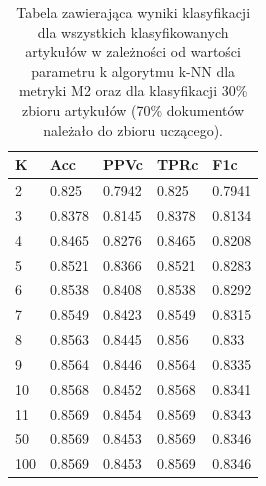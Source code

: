 \documentclass{classrep}
\begin{document}
\begin{table}[H]
    \centering
\caption{Tabela zawierająca wyniki klasyfikacji dla wszystkich klasyfikowanych artykułów w zależności od wartości parametru k algorytmu k-NN dla metryki M2 oraz dla klasyfikacji 30\% zbioru artykułów (70\% dokumentów należało do zbioru uczącego).}
\begin{adjustbox}{max width=\textwidth}
    \begin{tabular}{|l|l|l|l|l|}
    \hline
        K & Acc & PPVc & TPRc & F1c \\ \hline
        2 & 0.825 & 0.7942 & 0.825 & 0.7941 \\ \hline
        3 & 0.8378 & 0.8145 & 0.8378 & 0.8134 \\ \hline
        4 & 0.8465 & 0.8276 & 0.8465 & 0.8208 \\ \hline
        5 & 0.8521 & 0.8366 & 0.8521 & 0.8283 \\ \hline
        6 & 0.8538 & 0.8408 & 0.8538 & 0.8292 \\ \hline
        7 & 0.8549 & 0.8423 & 0.8549 & 0.8315 \\ \hline
        8 & 0.8563 & 0.8445 & 0.856 & 0.833 \\ \hline
        9 & 0.8564 & 0.8446 & 0.8564 & 0.8335 \\ \hline
        10 & 0.8568 & 0.8452 & 0.8568 & 0.8341 \\ \hline
        11 & 0.8569 & 0.8454 & 0.8569 & 0.8343 \\ \hline
        50 & 0.8569 & 0.8453 & 0.8569 & 0.8346 \\ \hline
        100 & 0.8569 & 0.8453 & 0.8569 & 0.8346 \\ \hline
    \end{tabular}
\end{adjustbox}
\end{table}
\end{document}
